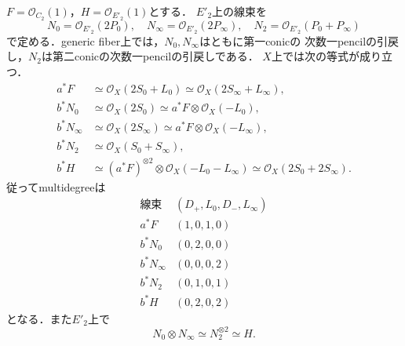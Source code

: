 \begin{proposition}[二つのpencilの具体的な延長]
\label{prop:qa-boundary-pencil-multidegrees}
$F=\mathcal O_{C_2}(1)$，$H=\mathcal O_{E'_2}(1)$とする．
$E'_2$上の線束を
\[
 N_0=\mathcal O_{E'_2}(2P_0),\quad
 N_\infty=\mathcal O_{E'_2}(2P_\infty),\quad
 N_2=\mathcal O_{E'_2}(P_0+P_\infty)
\]
で定める．generic fiber上では，$N_0,N_\infty$はともに第一conicの
次数一pencilの引戻し，$N_2$は第二conicの次数一pencilの引戻しである．
$X$上では次の等式が成り立つ．
\[
 \begin{split}
 a^*F&\simeq\mathcal O_X(2S_0+L_0)
       \simeq\mathcal O_X(2S_\infty+L_\infty),\\
 b^*N_0&\simeq\mathcal O_X(2S_0)
       \simeq a^*F\otimes\mathcal O_X(-L_0),\\
 b^*N_\infty&\simeq\mathcal O_X(2S_\infty)
       \simeq a^*F\otimes\mathcal O_X(-L_\infty),\\
 b^*N_2&\simeq\mathcal O_X(S_0+S_\infty),\\
 b^*H&\simeq(a^*F)^{\otimes2}\otimes\mathcal O_X(-L_0-L_\infty)
       \simeq\mathcal O_X(2S_0+2S_\infty).
 \end{split}
 \tag{P-desc}\label{eq:qa-boundary-pencil-divisors}
\]
従ってmultidegreeは
\[
 \begin{array}{c|c}
 \text{線束}&(D_+,L_0,D_-,L_\infty)\\\hline
 a^*F&(1,0,1,0)\\
 b^*N_0&(0,2,0,0)\\
 b^*N_\infty&(0,0,0,2)\\
 b^*N_2&(0,1,0,1)\\
 b^*H&(0,2,0,2)
 \end{array}
\]
となる．また$E'_2$上で
\[
             N_0\otimes N_\infty\simeq N_2^{\otimes2}\simeq H.
\]
\end{proposition}
